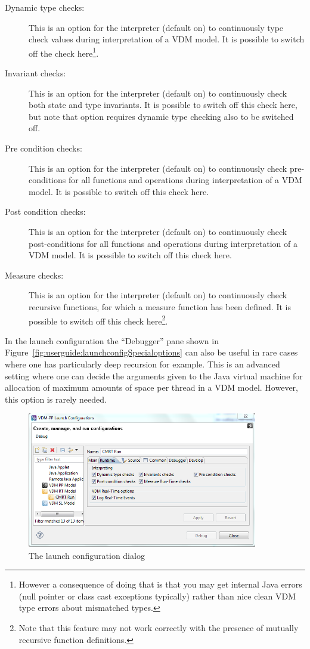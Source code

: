 \documentclass{overturerepchap}
\begin{document}
\begin{description}
\item[Dynamic type checks:] This is an option for the interpreter (default on)
  to continuously type check  values during interpretation of a VDM model.
  It is possible to switch off the check here\footnote{However a consequence of doing that is that you may get internal Java errors (null pointer or class cast exceptions typically) rather than nice clean VDM type errors about mismatched types.}.
\item[Invariant checks:] This is an option for the interpreter (default on)
  to continuously check both state and type invariants.
  It is possible to switch off
  this check here, but note that option requires dynamic type
  checking also to be switched off.
\item[Pre condition checks:] This is an option for the interpreter (default on)
  to continuously check pre-conditions for all functions and operations
  during interpretation of a VDM model. It is possible to switch off
  this check here.
\item[Post condition checks:] This is an option for the interpreter (default on)
  to continuously check post-conditions for all functions and operations
  during interpretation of a VDM model. It is possible to switch off
  this check here.
\item[Measure checks:] This is an option for the interpreter (default
  on) to continuously check recursive functions, for which a
  measure function has been defined. It is possible to switch off this
  check here\footnote{Note that this feature may not work correctly with the 
presence of mutually recursive function definitions.}.
\end{description}

In the launch
configuration the ``Debugger'' pane shown in
Figure~\ref{fig:userguide:launchconfigSpecialoptions} can also be
useful in rare cases where one has particularly deep recursion for
example. This is an advanced setting where one can decide the
arguments given to the Java virtual machine for allocation of maximum
amounts of space per thread in a VDM model. However, this option is
rarely needed.

\begin{figure}[htp]
\begin{center}
  \includegraphics[width=380px]{screenDumps/launchconfigRToptions}
  \caption{The launch configuration dialog}
  \label{fig:userguide:launchconfigRToptions}
\end{center}
\end{figure}
\end{document}
